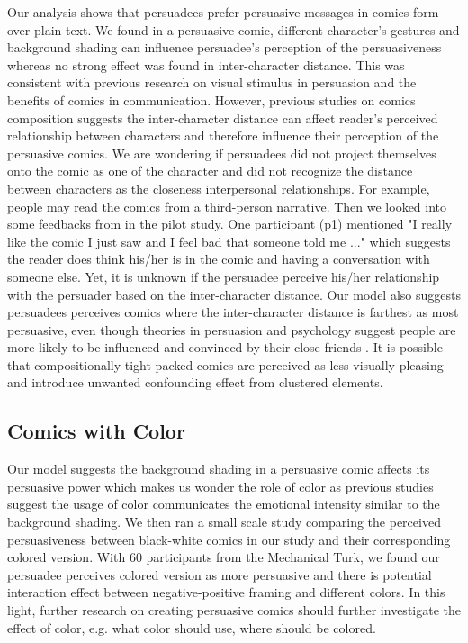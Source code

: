 Our analysis shows that persuadees prefer persuasive messages in comics form over plain text. We found in a persuasive comic, different character's gestures and background shading can influence persuadee's perception of the persuasiveness whereas no strong effect was found in inter-character distance. This was consistent with previous research on visual stimulus in persuasion and the benefits of comics in communication. However, previous studies on comics composition suggests the inter-character distance can affect reader's perceived relationship between characters and therefore influence their perception of the persuasive comics. We are wondering if persuadees did not project themselves onto the comic as one of the character and did not recognize the distance between characters as the closeness interpersonal relationships. For example, people may read the comics from a third-person narrative. Then we looked into some feedbacks from in the pilot study. One participant (p1) mentioned "I really like the comic I just saw and I feel bad that someone told me ..." which suggests the reader does think his/her is in the comic and having a conversation with someone else. Yet, it is unknown if the persuadee perceive his/her relationship with the persuader based on the inter-character distance. Our model also suggests persuadees perceives comics where the inter-character distance is farthest as most persuasive, even though theories in persuasion and psychology suggest people are more likely to be influenced and convinced by their close friends \cite{daddis2008influence,merga2014peer,shin2013user}. It is possible that compositionally tight-packed comics are perceived as less visually pleasing and introduce unwanted confounding effect from clustered elements.

\subsection{Comics with Color}
Our model suggests the background shading in a persuasive comic affects its persuasive power which makes us wonder the role of color as previous studies suggest the usage of color communicates the emotional intensity similar to the background shading. We then ran a small scale study comparing the perceived persuasiveness between black-white comics in our study and their corresponding colored version. With 60 participants from the Mechanical Turk,  we found our persuadee perceives colored version as more persuasive and there is potential interaction effect between negative-positive framing and different colors. In this light, further research on creating persuasive comics should further investigate the effect of color, e.g. what color should use, where should be colored.

